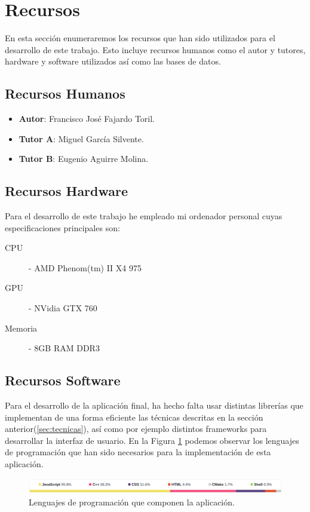 \documentclass[a4paper,11pt]{book}
\newcommand{\myName}{Francisco José Fajardo Toril\xspace}
\newcommand{\myProf}{Miguel García Silvente\xspace}
\newcommand{\myOtherProf}{Eugenio Aguirre Molina\xspace}
\begin{document}
\section{Recursos}
En esta sección enumeraremos los recursos que han sido utilizados para el desarrollo de este trabajo. Esto incluye recursos humanos como el autor y tutores, hardware y software utilizados así como las bases de datos.
\subsection{Recursos Humanos}
\begin{itemize}
	\item \textbf{Autor}: \myName.
	\item \textbf{Tutor A}: \myProf.
	\item \textbf{Tutor B}: \myOtherProf.
\end{itemize}
\subsection{Recursos Hardware}\label{subsec:hardware}
Para el desarrollo de este trabajo he empleado mi ordenador personal cuyas especificaciones principales son:
\begin{description}
	\item [CPU] - AMD Phenom(tm) II X4 975
	\item [GPU] - NVidia GTX 760
	\item [Memoria] - 8GB RAM DDR3
\end{description}
\subsection{Recursos Software}\label{sub:software}
Para el desarrollo de la aplicación final, ha hecho falta usar distintas librerías que implementan de una forma eficiente las técnicas descritas en la sección anterior(\ref{sec:tecnicas}), así como por ejemplo distintos frameworks para desarrollar la interfaz de usuario. En la Figura \ref{fig:programming_languages} podemos observar los lenguajes de programación que han sido necesarios para la implementación de esta aplicación.
\\
\begin{figure}[h]
	\centering
	\includegraphics[width=1.0\linewidth]{imagenes/programming_languages}
	\caption[Lenguajes de programación]{Lenguajes de programación que componen la aplicación\cite{franft}.}
	\label{fig:programming_languages}
\end{figure}
\end{document}
